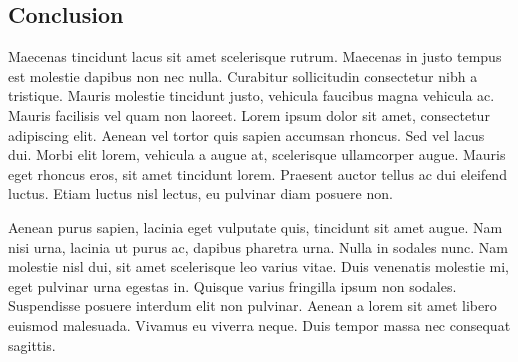 \subsection{Conclusion}

Maecenas tincidunt lacus sit amet scelerisque rutrum. Maecenas in justo tempus
est molestie dapibus non nec nulla. Curabitur sollicitudin consectetur nibh a
tristique. Mauris molestie tincidunt justo, vehicula faucibus magna vehicula
ac. Mauris facilisis vel quam non laoreet. Lorem ipsum dolor sit amet,
consectetur adipiscing elit. Aenean vel tortor quis sapien accumsan rhoncus.
Sed vel lacus dui. Morbi elit lorem, vehicula a augue at, scelerisque
ullamcorper augue. Mauris eget rhoncus eros, sit amet tincidunt lorem.
Praesent auctor tellus ac dui eleifend luctus. Etiam luctus nisl lectus, eu
pulvinar diam posuere non.

Aenean purus sapien, lacinia eget vulputate quis, tincidunt sit amet augue.
Nam nisi urna, lacinia ut purus ac, dapibus pharetra urna. Nulla in sodales
nunc. Nam molestie nisl dui, sit amet scelerisque leo varius vitae. Duis
venenatis molestie mi, eget pulvinar urna egestas in. Quisque varius fringilla
ipsum non sodales. Suspendisse posuere interdum elit non pulvinar. Aenean a
lorem sit amet libero euismod malesuada. Vivamus eu viverra neque. Duis tempor
massa nec consequat sagittis. 
